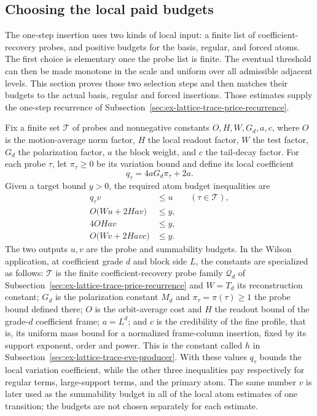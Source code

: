 \subsection{Choosing the local paid budgets}
\label{sec:ex-lattice-local-paid-budgets}

The one-step insertion uses two kinds of local input: a finite list of
coefficient-recovery probes, and positive budgets for the basis, regular,
and forced atoms. The first choice is elementary once the probe list is
finite. The eventual threshold can then be made monotone in the scale and
uniform over all admissible adjacent levels. This section proves those two
selection steps and then matches their budgets to the actual basis,
regular and forced insertions. Those estimates supply the one-step
recurrence of Subsection~\ref{sec:ex-lattice-trace-price-recurrence}.

Fix a finite set \(\mathcal T\) of probes and nonnegative constants
\(O,H,W,G_d,a,c\), where \(O\) is the motion-average norm factor, \(H\) the local
readout factor, \(W\) the test factor, \(G_d\) the polarization factor,
\(a\) the block weight, and \(c\) the tail-decay factor. For each probe
\(\tau\), let \(\pi_\tau\geq0\) be its variation bound and define its
local coefficient
\[
 q_\tau=4aG_d\pi_\tau+2a.
\]
Given a target bound \(y>0\), the required atom budget inequalities are
\begin{align}
 q_\tau v&\leq u &&(\tau\in\mathcal T), \label{eq:ex-lattice-atom-cycle}\\
 O\bigl(Wu+2Hav\bigr)&\leq y, \label{eq:ex-lattice-atom-regular}\\
 4OHav&\leq y, \label{eq:ex-lattice-atom-large}\\
 O\bigl(Wv+2Havc\bigr)&\leq y. \label{eq:ex-lattice-atom-main}
\end{align}
The two outputs \(u,v\) are the probe and summability budgets. In the
Wilson application, at coefficient grade \(d\) and block side \(L\), the
constants are specialized as follows: \(\mathcal T\) is the finite
coefficient-recovery probe family \(\mathcal Q_d\) of
Subsection~\ref{sec:ex-lattice-trace-price-recurrence} and \(W=T_d\) its
reconstruction constant; \(G_d\) is the polarization constant \(M_d\) and
\(\pi_\tau=\pi(\tau)\geq1\) the probe bound defined there; \(O\) is the
orbit-average cost and \(H\) the readout bound of the grade-\(d\)
coefficient frame; \(a=L^d\); and \(c\) is the credibility of the fine profile,
that is, its uniform mass bound for a normalized frame-column insertion,
fixed by its support exponent, order and power. This is the constant called $h$ in
Subsection~\ref{sec:ex-lattice-trace-eve-producer}. With
these values \(q_\tau\) bounds the local variation coefficient,
while the other three inequalities pay respectively for regular terms,
large-support terms, and the primary atom. The same number \(v\) is later
used as the summability budget in all of the local atom estimates of one
transition; the budgets are not chosen separately for each estimate.

